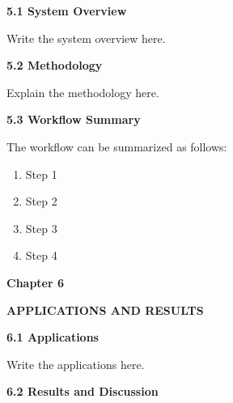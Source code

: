 \documentclass[12pt]{article}
\begin{document}
\vspace{0.6cm}

\noindent
\textbf{5.1 System Overview}

\vspace{0.25cm}

Write the system overview here.

\vspace{0.5cm}

\noindent
\textbf{5.2 Methodology}

\vspace{0.25cm}

Explain the methodology here.

\vspace{0.5cm}

\noindent
\textbf{5.3 Workflow Summary}

\vspace{0.25cm}

The workflow can be summarized as follows:

\begin{enumerate}
\item Step 1
\item Step 2
\item Step 3
\item Step 4
\end{enumerate}

\newpage

\begin{center}
\textbf{\Large Chapter 6}
\end{center}

\vspace{0.4cm}

\begin{center}
\textbf{\Large APPLICATIONS AND RESULTS}
\end{center}

\vspace{0.6cm}

\noindent
\textbf{6.1 Applications}

\vspace{0.25cm}

Write the applications here.

\vspace{0.5cm}

\noindent
\textbf{6.2 Results and Discussion}

\vspace{0.25cm}
\end{document}
